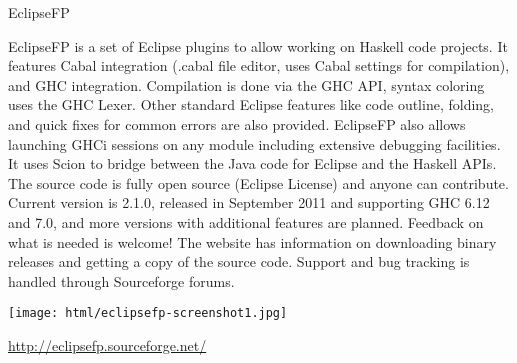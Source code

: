 \begin{hcarentry}[updated]{EclipseFP}
\makeheader

EclipseFP is a set of Eclipse plugins to allow working on Haskell code projects.
It features Cabal integration (.cabal file editor, uses Cabal settings for compilation), and GHC integration. Compilation is done via the GHC API, syntax coloring uses the GHC Lexer. Other standard Eclipse features like code outline, folding, and quick fixes for common errors are also provided. EclipseFP also allows launching GHCi sessions on any module including extensive debugging facilities. It uses Scion to bridge between the Java code for Eclipse and the Haskell APIs.
The source code is fully open source (Eclipse License) and anyone can contribute. Current version is 2.1.0, released in September 2011 and supporting GHC 6.12 and 7.0, and more versions with additional features are planned. Feedback on what is needed is welcome! The website has information on downloading binary releases and getting a copy of the source code. Support and bug tracking is handled through Sourceforge forums.

\begin{center}
\texttt{[image: html/eclipsefp-screenshot1.jpg]}
\end{center}

\FurtherReading 
\url{http://eclipsefp.sourceforge.net/}
\end{hcarentry}
